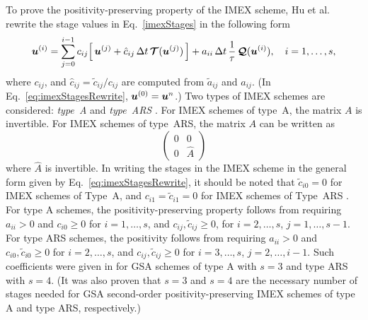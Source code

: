 To prove the positivity-preserving property of the IMEX scheme, Hu et al. \cite{hu_etal_2018} rewrite the stage values in Eq.~\eqref{imexStages} in the following form
\begin{equation}
  \boldsymbol{u}^{(i)}
  =\sum_{j=0}^{i-1}c_{ij}\Big[\,\boldsymbol{u}^{(j)}+\hat{c}_{ij}\,\Delta t\,\boldsymbol{\mathcal{T}}(\boldsymbol{u}^{(j)})\,\Big]
  +a_{ii}\,\Delta t\,\frac{1}{\tau}\,\boldsymbol{\mathcal{Q}}(\boldsymbol{u}^{(i)}),\quad i=1,\ldots,s,
  \label{eq:imexStagesRewrite}
\end{equation}
where $c_{ij}$, and $\hat{c}_{ij}=\tilde{c}_{ij}/c_{ij}$ are computed from $\tilde{a}_{ij}$ and $a_{ij}$.
(In Eq.~\eqref{eq:imexStagesRewrite}, $\boldsymbol{u}^{(0)}=\boldsymbol{u}^{n}$.)  
Two types of IMEX schemes are considered: \emph{type~A} \cite{pareschiRusso_2005} and \emph{type~ARS} \cite{ascher_etal_1997}.  
For IMEX schemes of type~A, the matrix $A$ is invertible.  
For IMEX schemes of type~ARS, the matrix $A$ can be written as
\[\left( 
   \begin{matrix} 
       0 & 0 \\ 
       0 & \hat{A}
   \end{matrix}
\right)\]
where $\hat{A}$ is invertible.
In writing the stages in the IMEX scheme in the general form given by Eq.~\eqref{eq:imexStagesRewrite}, it should be noted that $\tilde{c}_{i0}=0$ for IMEX schemes of Type~A, and $c_{i1}=\tilde{c}_{i1}=0$ for IMEX schemes of Type~ARS \cite{hu_etal_2018}.  
For type A schemes, the positivity-preserving property follows from requiring $a_{ii}>0$ and $c_{i0}\ge0$ for $i=1,\ldots,s$, and $c_{ij},\tilde{c}_{ij}\ge0$, for $i=2,\ldots,s$, $j=1,\ldots,s-1$.  
For type ARS schemes, the positivity follows from requiring $a_{ii}>0$ and $c_{i0},\tilde{c}_{i0}\ge0$ for $i=2,\ldots,s$, and $c_{ij},\tilde{c}_{ij}\ge0$ for $i=3,\ldots,s$, $j=2,\ldots,i-1$.  
Such coefficients were given in \cite{hu_etal_2018} for GSA schemes of type A with $s=3$ and type ARS with $s=4$.  
(It was also proven that $s=3$ and $s=4$ are the necessary number of stages needed for GSA second-order positivity-preserving IMEX schemes of type A and type ARS, respectively.)  

